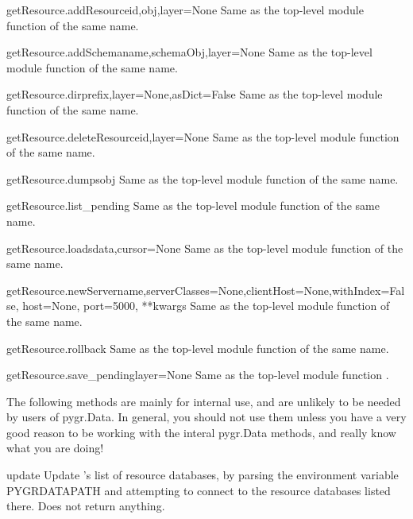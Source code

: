 \documentclass{howto}
\begin{document}
\begin{funcdesc}{getResource.addResource}{id,obj,layer=None}
  Same as the top-level module function of the same name.
\end{funcdesc}

\begin{funcdesc}{getResource.addSchema}{name,schemaObj,layer=None}
  Same as the top-level module function of the same name.
\end{funcdesc}

\begin{funcdesc}{getResource.dir}{prefix,layer=None,asDict=False}
  Same as the top-level module function of the same name.
\end{funcdesc}

\begin{funcdesc}{getResource.deleteResource}{id,layer=None}
  Same as the top-level module function of the same name.
\end{funcdesc}

\begin{funcdesc}{getResource.dumps}{obj}
  Same as the top-level module function of the same name.
\end{funcdesc}

\begin{funcdesc}{getResource.list_pending}{}
  Same as the top-level module function of the same name.
\end{funcdesc}

\begin{funcdesc}{getResource.loads}{data,cursor=None}
  Same as the top-level module function of the same name.
\end{funcdesc}

\begin{funcdesc}{getResource.newServer}{name,serverClasses=None,clientHost=None,withIndex=False, host=None, port=5000, **kwargs}
  Same as the top-level module function of the same name.
\end{funcdesc}

\begin{funcdesc}{getResource.rollback}{}
  Same as the top-level module function of the same name.
\end{funcdesc}

\begin{funcdesc}{getResource.save_pending}{layer=None}
  Same as the top-level module function .
\end{funcdesc}

The following methods are mainly for internal use, and are unlikely to be
needed by users of pygr.Data.  In general, you should not use them unless
you have a very good reason to be working with the interal pygr.Data 
methods, and really know what you are doing!
\begin{funcdesc}{update}{}
  Update 's list of resource databases, by parsing the environment
  variable PYGRDATAPATH and attempting to connect to the resource databases
  listed there.  Does not return anything.
\end{funcdesc}
\end{document}
